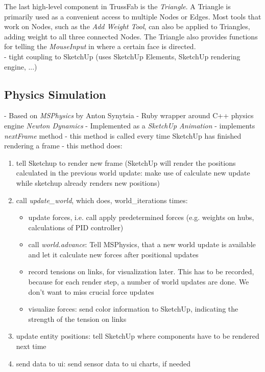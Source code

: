 The last high-level component in TrussFab is the \textit{Triangle}. A Triangle is primarily used as a convenient access to multiple Nodes or Edges. Most tools that work on Nodes, such as the \textit{Add Weight Tool}, can also be applied to Triangles, adding weight to all three connected Nodes. The Triangle also provides functions for telling the \textit{MouseInput} in where a certain face is directed.
\\- tight coupling to SketchUp (uses SketchUp Elements, SketchUp rendering engine, ...)
\subsection{Physics Simulation}
- Based on \textit{MSPhysics} by Anton Synytsia
- Ruby wrapper around C++ physics engine \textit{Newton Dynamics}
- Implemented as a \textit{SketchUp Animation}
- implements \textit{nextFrame} method
- this method is called every time SketchUp has finished rendering a frame
- this method does:
\begin{enumerate}
    \item tell Sketchup to render new frame (SketchUp will render the positions calculated in the previous world update: make use of calculate new update while sketchup already renders new positions)
    \item call \textit{update\_world}, which does, world\_iterations times:
    \begin{itemize}
        \item update forces, i.e. call apply predetermined forces (e.g. weights on hubs, calculations of PID controller)
        \item call \textit{world.advance}: Tell MSPhysics, that a new world update is available and let it calculate new forces after positional updates
        \item record tensions on links, for visualization later. This has to be recorded, because for each render step, a number of world updates are done. We don't want to miss crucial force updates
        \item visualize forces: send color information to SketchUp, indicating the strength of the tension on links
    \end{itemize}
    \item update entity positions: tell SketchUp where components have to be rendered next time
    \item send data to ui: send sensor data to ui charts, if needed
\end{enumerate}
